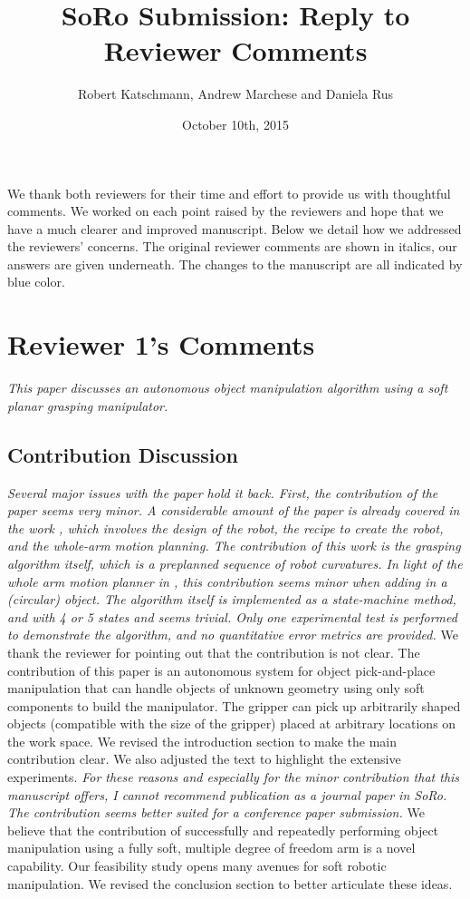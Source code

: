 \documentclass[letterpaper, 10 pt, twocolumn, conference]{article}
\begin{document}
\title{SoRo Submission: Reply to Reviewer Comments}
\author{Robert Katschmann, Andrew Marchese and Daniela Rus}
\date{October 10th, 2015}
\maketitle

We thank both reviewers for their time and effort to provide us with thoughtful comments. We worked on each point raised by the reviewers and hope that we have a much clearer and improved manuscript. Below we detail how we addressed the reviewers’ concerns. The original reviewer comments are shown in italics, our answers are given underneath. The changes to the manuscript are all indicated by blue color.


\section{Reviewer 1's Comments}

\textit{This paper discusses an autonomous object manipulation algorithm using a soft planar grasping manipulator.}

\subsection{Contribution Discussion}
\textit{Several major issues with the paper hold it back. First, the contribution of the paper seems very minor. A considerable amount of the paper is already covered in the work\cite{marchese2014whole} \cite{marchese2014design} \cite{marchese2015recipe}, which involves the design of the robot, the recipe to create the robot, and the whole-arm motion planning. The contribution of this work is the grasping algorithm itself, which is a preplanned sequence of robot curvatures. In light of the whole arm motion planner in  \cite{marchese2014whole}, this contribution seems minor when adding in a (circular) object.  The algorithm itself is implemented as a state-machine method, and with 4 or 5 states and seems trivial. Only one experimental test is performed to demonstrate the algorithm, and no quantitative error metrics are provided.}
%
We thank the reviewer for pointing out that the contribution is not clear. The contribution of this paper is an autonomous system for object pick-and-place manipulation that can handle objects of unknown geometry using only soft components to build the manipulator. The gripper can pick up arbitrarily shaped objects (compatible with the size of the gripper) placed at arbitrary locations on the work space. We revised the introduction section to make the main contribution clear. We also adjusted the text to highlight the extensive experiments. 
%
\textit{For these reasons and especially for the minor contribution that this manuscript offers, I cannot recommend publication as a journal paper in SoRo. The contribution seems better suited for a conference paper submission.}
%
We believe that the contribution of successfully and repeatedly performing object manipulation using a fully soft, multiple degree of freedom arm is a novel capability. Our feasibility study opens many avenues for soft robotic manipulation. We revised the conclusion section to better articulate these ideas. 
%
\end{document}
